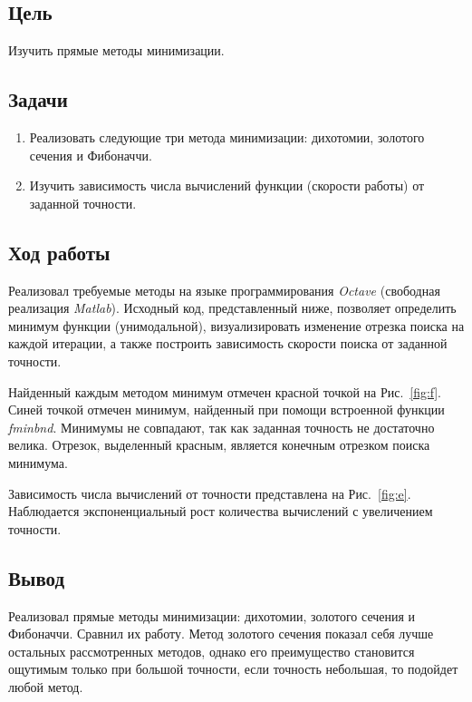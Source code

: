 

 

\newcommand{\labn}{2}


\subsection*{Цель}

Изучить прямые методы минимизации.

\subsection*{Задачи}

\begin{enumerate}
	\item Реализовать следующие три метода минимизации: дихотомии, золотого сечения и Фибоначчи.
	\item Изучить зависимость числа вычислений функции (скорости работы) от заданной точности.
\end{enumerate}

\subsection*{Ход работы}

Реализовал требуемые методы на языке программирования \textit{Octave} (свободная реализация \textit{Matlab}). 
Исходный код, представленный ниже, позволяет определить минимум функции (унимодальной), 
визуализировать изменение отрезка поиска на каждой итерации, 
а также построить зависимость скорости поиска от заданной точности.

Найденный каждым методом минимум отмечен красной точкой на Рис.~\ref{fig:f}.
Синей точкой отмечен минимум, найденный при помощи встроенной функции \textit{fminbnd}.
Минимумы не совпадают, так как заданная точность не достаточно велика.
Отрезок, выделенный красным, является конечным отрезком поиска минимума.

Зависимость числа вычислений от точности представлена на Рис.~\ref{fig:e}. Наблюдается экспоненциальный рост количества вычислений с увеличением точности.

\subsection*{Вывод}

Реализовал прямые методы минимизации: дихотомии, золотого сечения и Фибоначчи. Сравнил их работу.
Метод золотого сечения показал себя лучше остальных рассмотренных методов, однако его преимущество
становится ощутимым только при большой точности, если точность небольшая, то подойдет любой метод.


